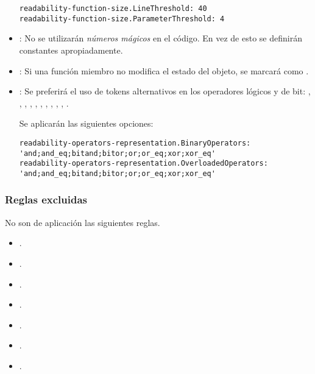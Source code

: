 \begin{itemize}
\begin{lstlisting}
readability-function-size.LineThreshold: 40
readability-function-size.ParameterThreshold: 4
\end{lstlisting}

\item {}:
No se utilizarán \emph{números mágicos} en el código.
En vez de esto se definirán constantes apropiadamente.

\item {}:
Si una función miembro no modifica el estado del objeto, se marcará como .

\item {}:
Se preferirá el uso de tokens alternativos en los operadores lógicos y de bit:
, , , , ,
, , , , ,
.

Se aplicarán las siguientes opciones:

\begin{lstlisting}
readability-operators-representation.BinaryOperators: 'and;and_eq;bitand;bitor;or;or_eq;xor;xor_eq'
readability-operators-representation.OverloadedOperators: 'and;and_eq;bitand;bitor;or;or_eq;xor;xor_eq'
\end{lstlisting}

\end{itemize}

\subsubsection{Reglas excluidas}

No son de aplicación las siguientes reglas.

\begin{itemize}

\item {}.
\item {}.
\item {}.
\item {}.
\item {}.
\item {}.
\item {}.

\end{itemize}


